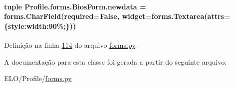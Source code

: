 \paragraph[{newdata}]{\setlength{\rightskip}{0pt plus 5cm}tuple Profile.\+forms.\+Bios\+Form.\+newdata = forms.\+Char\+Field(required=False, widget=forms.\+Textarea(attrs=\{\textquotesingle{}style\textquotesingle{}\+:\textquotesingle{}width\+:90\%;\textquotesingle{}\}))\hspace{0.3cm}{\ttfamily [static]}}\label{classProfile_1_1forms_1_1BiosForm_a2862b20c24bac9aa5dc896925a2cb3d6}


Definição na linha \hyperlink{Profile_2forms_8py_source_l00114}{114} do arquivo \hyperlink{Profile_2forms_8py_source}{forms.\+py}.



A documentação para esta classe foi gerada a partir do seguinte arquivo\+:\begin{DoxyCompactItemize}
\item 
E\+L\+O/\+Profile/\hyperlink{Profile_2forms_8py}{forms.\+py}\end{DoxyCompactItemize}

